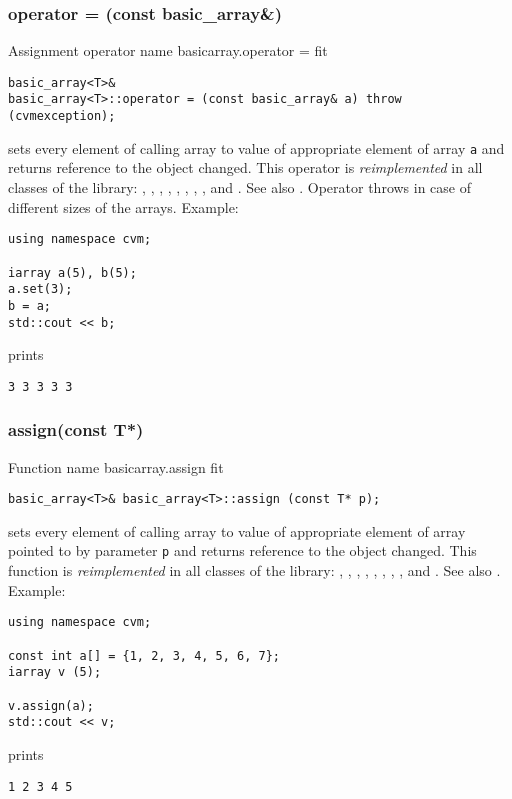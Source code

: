 \subsubsection{operator = (const basic\_array\&)}
Assignment operator%
\pdfdest name {basicarray.operator =} fit
\begin{verbatim}
basic_array<T>&
basic_array<T>::operator = (const basic_array& a) throw (cvmexception);
\end{verbatim}
sets every element of  calling array to  value of
appropriate element of  array \verb"a"
and returns  reference to the object changed.
This operator is \emph{reimplemented} in all classes of the library:
,  ,
,   ,
, ,
, ,
 and .
See also .
Operator throws 
in case of different sizes of the arrays.
Example:
\begin{Verbatim}
using namespace cvm;

iarray a(5), b(5);
a.set(3);
b = a;
std::cout << b;
\end{Verbatim}
prints
\begin{Verbatim}
3 3 3 3 3
\end{Verbatim}
\newpage


\subsubsection{assign(const T*)}
Function%
\pdfdest name {basicarray.assign} fit
\begin{verbatim}
basic_array<T>& basic_array<T>::assign (const T* p);
\end{verbatim}
sets every element of  calling array to  value of
appropriate element of  array pointed to by parameter \verb"p"
and returns  reference to the object changed.
This function is \emph{reimplemented} in all classes of the library:
,  ,
,   ,
, ,
, ,
 and .
See also .
Example:
\begin{Verbatim}
using namespace cvm;

const int a[] = {1, 2, 3, 4, 5, 6, 7};
iarray v (5);

v.assign(a);
std::cout << v;
\end{Verbatim}
prints
\begin{Verbatim}
1 2 3 4 5
\end{Verbatim}
\newpage


